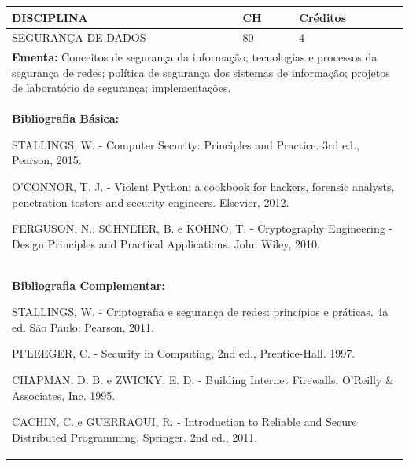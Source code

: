 \documentclass[a4paper, 12pt, openright, oneside, german, french, english, brazil]{abntex2}
\begin{document}
\begin{table}[!h]
  \footnotesize
  \centering
  \begin{tabular}{|p{100mm}|p{10mm}|p{20mm}|}
    \hline
    \textbf{DISCIPLINA} & \textbf{CH} & \textbf{Créditos} \\
    \hline
    SEGURANÇA DE DADOS & 80 & 4 \\
    \hline
    \multicolumn{3}{|p{130mm}|}{\textbf{Ementa:}  Conceitos de segurança da informação; tecnologias e processos da segurança de redes; política de segurança dos sistemas de informação; projetos de laboratório de segurança; implementações.} \\
    \hline
    \multicolumn{3}{|p{130mm}|}{\textbf{Bibliografia Básica:}

    STALLINGS, W. - Computer Security: Principles and Practice. 3rd ed., Pearson, 2015. 

O'CONNOR, T. J. - Violent Python: a cookbook for hackers, forensic analysts, penetration testers and security engineers. Elsevier, 2012. 

FERGUSON, N.; SCHNEIER, B. e KOHNO, T. - Cryptography Engineering - Design Principles and Practical Applications. John Wiley, 2010. 
} \\
    \hline
    \multicolumn{3}{|p{130mm}|}{\textbf{Bibliografia Complementar:}

    STALLINGS, W. - Criptografia e segurança de redes: princípios e práticas. 4a ed. São Paulo: Pearson, 2011. 

PFLEEGER, C. - Security in Computing, 2nd ed., Prentice-Hall. 1997. 

CHAPMAN, D. B. e ZWICKY, E. D. - Building Internet Firewalls. O'Reilly \& Associates, Inc. 1995. 

CACHIN, C. e GUERRAOUI, R. - Introduction to Reliable and Secure Distributed Programming. Springer. 2nd ed., 2011. 
} \\
    \hline
  \end{tabular}
\end{table}
\end{document}
